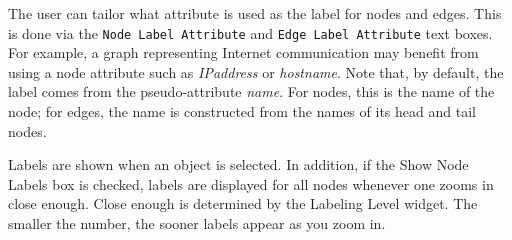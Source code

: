 The user can tailor what attribute is used as the label for nodes and edges. This is done via
the {\tt Node Label Attribute} and {\tt Edge Label Attribute} text boxes. For example,
a graph representing Internet communication may benefit from using a node attribute such
as {\it IPaddress} or {\it hostname}. Note that,
by default, the label comes from the pseudo-attribute {\it name}. For nodes, this is the
name of the node; for edges, the name is constructed from the names of its head and tail nodes.

Labels are shown when an object is selected. In addition, if the Show Node Labels box is checked,
labels are displayed for all nodes whenever one zooms in close enough. Close enough is determined
by the Labeling Level widget. The smaller the number, the sooner labels appear as you zoom in.
 
